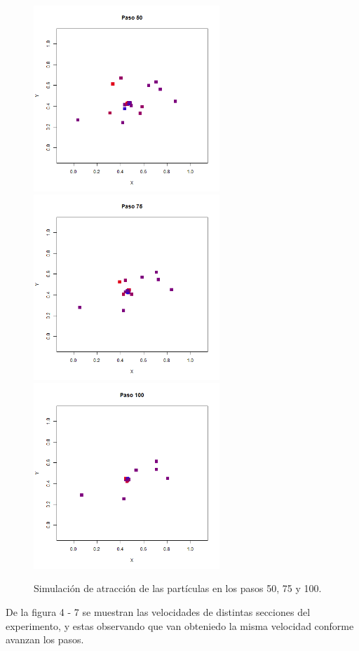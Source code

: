 \documentclass{article}
\begin{document}
\begin{figure}[H]
\centering
\includegraphics[width=7cm]{p9_t050.png} \includegraphics[width=7cm]{p9_t075.png}
\includegraphics[width=7cm]{p9_t100.png}
\caption{Simulación de atracción de las partículas en los pasos 50, 75 y 100.}
\end{figure}
De la figura 4 - 7 se muestran las velocidades de distintas secciones del experimento, y estas observando que van obteniedo la misma velocidad conforme avanzan los pasos.
\end{document}
